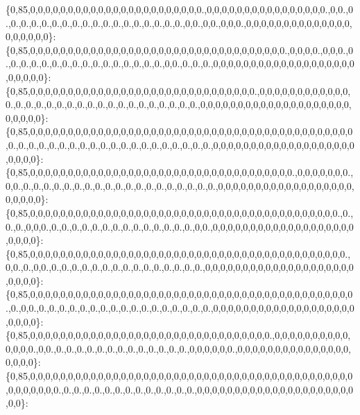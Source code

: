 \{0,85,0,0,0,0,0,0,0,0,0,0,0,0,0,0,0,0,0,0,0,0,0,0,0.,0,0,0,0,0,0,0,0,0,0,0,0,0,0,0,0.,0,0.,0.,0.,0.,0.,0.,0.,0.,0.,0.,0.,0.,0.,0.,0.,0.,0.,0.,0.,0,0.,0,0.,0,0,0.,0,0,0,0,0,0,0,0,0,0,0,0,0,0,0,0,0,0,0,0\}\+: \{0,85,0,0,0,0,0,0,0,0,0,0,0,0,0,0,0,0,0,0,0,0,0,0,0,0,0,0,0,0,0,0,0,0,0,0.,0,0,0,0.,0,0,0.,0.,0.,0.,0.,0.,0.,0.,0.,0.,0.,0.,0.,0.,0.,0.,0.,0,0.,0.,0.,0.,0,0,0,0,0,0,0,0,0,0,0,0,0,0,0,0,0,0,0,0,0,0,0,0\}\+: \{0,85,0,0,0,0,0,0,0,0,0,0,0,0,0,0,0,0,0,0,0,0,0,0,0,0,0,0,0,0,0,0.,0,0,0,0,0,0,0,0,0,0,0,0,0.,0.,0.,0.,0.,0.,0.,0.,0.,0.,0.,0.,0.,0.,0.,0.,0.,0.,0.,0,0,0,0,0,0,0,0,0,0,0,0,0,0,0,0,0,0,0,0,0,0,0,0,0\}\+: \{0,85,0,0,0,0,0,0,0,0,0,0,0,0,0,0,0,0,0,0,0,0,0,0,0,0,0,0,0,0,0,0,0,0,0,0,0,0,0,0,0,0,0,0,0,0.,0.,0.,0.,0.,0.,0.,0.,0.,0.,0.,0.,0.,0.,0.,0.,0.,0.,0.,0.,0,0,0,0,0,0,0,0,0,0,0,0,0,0,0,0,0,0,0,0,0,0,0\}\+: \{0,85,0,0,0,0,0,0,0,0,0,0,0,0,0,0,0,0,0,0,0,0,0,0,0,0,0,0,0,0,0,0,0,0,0,0,0.,0,0,0,0,0,0,0.,0,0.,0.,0.,0.,0.,0.,0.,0.,0.,0.,0.,0.,0.,0.,0.,0.,0.,0.,0.,0.,0,0,0,0,0,0,0,0,0,0,0,0,0,0,0,0,0,0,0,0,0,0,0\}\+: \{0,85,0,0,0,0,0,0,0,0,0,0,0,0,0,0,0,0,0,0,0,0,0,0,0,0,0,0,0,0,0,0,0,0,0,0,0,0,0,0,0,0,0.,0.,0.,0.,0,0,0.,0.,0.,0.,0.,0.,0.,0.,0.,0.,0.,0.,0.,0.,0.,0,0.,0,0,0,0,0,0,0,0,0,0,0,0,0,0,0,0,0,0,0,0,0,0,0\}\+: \{0,85,0,0,0,0,0,0,0,0,0,0,0,0,0,0,0,0,0,0,0,0,0,0,0,0,0,0,0,0,0,0,0,0,0,0,0,0,0,0,0,0,0,0.,0,0.,0.,0,0.,0.,0.,0.,0.,0.,0.,0.,0.,0.,0.,0.,0.,0.,0.,0.,0,0,0,0,0,0,0,0,0,0,0,0,0,0,0,0,0,0,0,0,0,0,0,0\}\+: \{0,85,0,0,0,0,0,0,0,0,0,0,0,0,0,0,0,0,0,0,0,0,0,0,0,0,0,0,0,0,0,0,0,0,0,0,0,0,0,0,0,0,0,0,0.,0.,0,0.,0.,0.,0.,0.,0.,0.,0.,0.,0.,0.,0.,0.,0.,0.,0.,0.,0.,0,0,0,0,0,0,0,0,0,0,0,0,0,0,0,0,0,0,0,0,0,0,0\}\+: \{0,85,0,0,0,0,0,0,0,0,0,0,0,0,0,0,0,0,0,0,0,0,0,0,0,0,0,0,0,0,0,0,0,0.,0,0,0,0,0,0,0,0,0,0,0,0,0,0.,0,0.,0.,0.,0.,0.,0.,0.,0.,0.,0.,0.,0.,0.,0.,0,0,0,0,0,0.,0,0,0,0,0,0,0,0,0,0,0,0,0,0,0,0,0,0,0\}\+: \{0,85,0,0,0,0,0,0,0,0,0,0,0,0,0,0,0,0,0,0,0,0,0,0,0,0,0,0,0,0,0,0,0,0,0,0,0,0,0,0,0,0,0,0,0,0,0,0,0,0,0,0.,0.,0.,0.,0.,0.,0.,0.,0.,0.,0.,0.,0.,0.,0,0,0,0,0,0,0,0,0,0,0,0,0,0,0,0,0,0,0,0,0,0,0\}\+: 